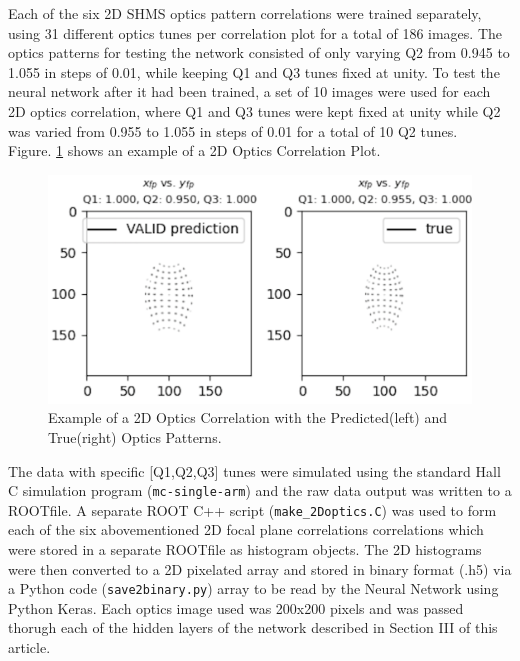 \documentclass[conference]{IEEEtran}
\begin{document}
Each of the six 2D SHMS optics pattern correlations were trained separately, using 31 different optics tunes
per correlation plot for a total of 186 images. The optics patterns for testing the network consisted of only
varying Q2 from 0.945 to 1.055 in steps of 0.01, while keeping Q1 and Q3 tunes fixed at unity.
To test the neural network after it had been trained, a set of 10 images were used for each 2D optics correlation, where Q1 and Q3
tunes were kept fixed at unity while Q2 was varied from 0.955 to 1.055 in steps of 0.01 for a total of 10 Q2 tunes.\\ Figure. \ref{fig:2d_correlation2} shows an example of a 2D Optics Correlation Plot.




\begin{figure}[h]
 \centering
  \includegraphics[scale=0.2]{images/2d_correlation2.png}
  \caption{Example of a 2D Optics Correlation with the Predicted(left) and True(right) Optics Patterns.}
  \label{fig:2d_correlation2}
\end{figure}

\newcommand{\RNum}[1]{\uppercase\expandafter{\romannumeral #1\relax}}


The data with specific [Q1,Q2,Q3] tunes were simulated using the standard Hall C simulation program (\texttt{mc-single-arm})
and the raw data output was written to a ROOTfile. A separate ROOT C++ script (\texttt{make\_2Doptics.C}) was used to form each of
the six abovementioned 2D focal plane correlations correlations which were stored in a separate ROOTfile as histogram objects.
The 2D histograms were then converted to a 2D pixelated array and stored in binary format (.h5) via a Python code (\texttt{save2binary.py})
array to be read by the Neural Network using Python Keras. Each optics image used was 200x200 pixels and was passed thorugh each of
the hidden layers of the network described in Section III of this article.
\end{document}
